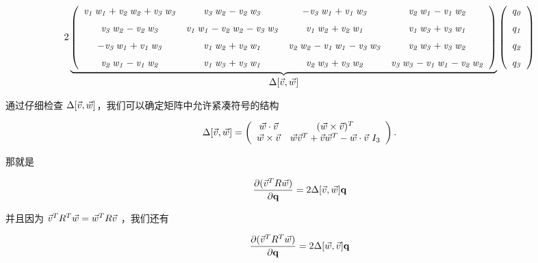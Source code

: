 \footnotesize
$$ 2  \underbrace{
\left( \begin {array}{cccc} {\it v_1}\,{\it w_1}+{\it v_2}\,{\it w_2}+{\it v_3}\,{\it w_3}&{\it v_3}\,{\it w_2}-{\it v_2}\,{\it w_3}&-{\it v_3}\,{\it w_1}+{\it v_1}\,{\it w_3}&{\it v_2}\,{\it w_1}-{\it v_1}\,{\it w_2}\\\noalign{\medskip}{\it v_3}\,{\it w_2}-{\it v_2}\,{\it w_3}&{\it v_1}\,{\it w_1}-{\it v_2}\,{\it w_2}-{\it v_3}\,{\it w_3}&{\it v_1}\,{\it w_2}+{\it v_2}\,{\it w_1}&{\it v_1}\,{\it w_3}+{\it v_3}\,{\it w_1}\\\noalign{\medskip}-{\it v_3}\,{\it w_1}+{\it v_1}\,{\it w_3}&{\it v_1}\,{\it w_2}+{\it v_2}\,{\it w_1}&{\it v_2}\,{\it w_2}-{\it v_1}\,{\it w_1}-{\it v_3}\,{\it w_3}&{\it v_2}\,{\it w_3}+{\it v_3}\,{\it w_2}\\\noalign{\medskip}{\it v_2}\,{\it w_1}-{\it v_1}\,{\it w_2}&{\it v_1}\,{\it w_3}+{\it v_3}\,{\it w_1}&{\it v_2}\,{\it w_3}+{\it v_3}\,{\it w_2}&{\it v_3}\,{\it w_3}-{\it v_1}\,{\it w_1}-{\it v_2}\,{\it w_2}\end {array} \right) 
}_{\mbox{\normalsize $\Delta[\v{v},\v{w}]$}}
 \left( \begin {array}{c} {\it q_0}\\\noalign{\medskip}{\it q_1}\\\noalign{\medskip}{\it q_2}\\\noalign{\medskip}{\it q_3}\end {array} \right) $$ \normalsize


通过仔细检查 $\Delta[\vec{v},\vec{w}]$，我们可以确定矩阵中允许紧凑符号的结构


\begin{equation}
\Delta[\vec{v},\vec{w}] = 
\left( \begin {array}{cc}
\vec{w} \cdot \vec{v}    &      (\vec{w} \times \vec{v})^T   \\
\vec{w} \times \vec{v}         &       \vec{w}\vec{v}^T + \vec{v}\vec{w}^T  - \vec{w} \cdot \vec{v} \ I_3 
\end {array} \right).
\label{eqD_DELTA}
\end{equation}

那就是


\begin{equation}
\frac{\partial (\vec{v}^TR\vec{w})}{\partial \mathbf{q}} =
2 \Delta[\vec{v},\vec{w}] \mathbf{q}
\label{eqD_DELTAq}
\end{equation}

并且因为 $\vec{v}^TR^T\vec{w} = \vec{w}^TR\vec{v}$ ，我们还有

\begin{equation}
\frac{\partial (\vec{v}^TR^T\vec{w})}{\partial \mathbf{q}} =
2 \Delta[\vec{w},\vec{v}] \mathbf{q}
\label{eqD_DELTAq2}
\end{equation}


